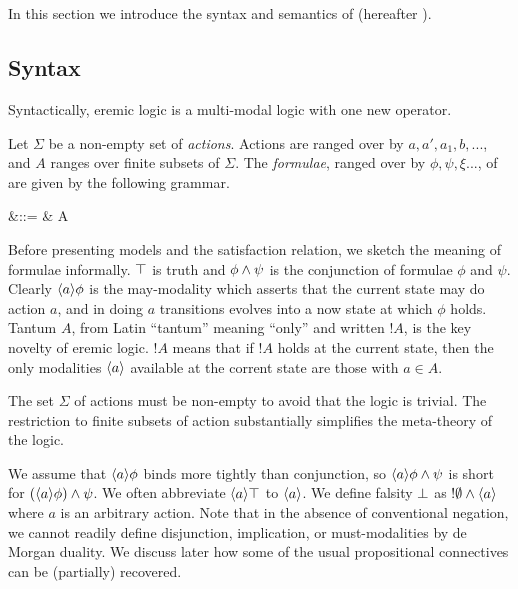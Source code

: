 \section{\ELFULL}\label{coreEL}

In this section we introduce the syntax and semantics of \ELFULL{}
(hereafter \ELABR{}).  

\subsection{Syntax}
\label{elsyntax}
\NI Syntactically, eremic logic is a multi-modal logic with one new
operator.

\begin{definition} Let $\Sigma$ be a non-empty set of \emph{actions}.
Actions are ranged over by $a, a', a_1, b, ...$, and $A$ ranges over
finite subsets of $\Sigma$. The \emph{formulae}, ranged over by $\phi,
\psi, \xi ...$, of \ELABR{} are given by the
following grammar.

\begin{GRAMMAR}
  \phi 
     &\quad ::= \quad & 
  \TRUE 
     \VERTICAL 
  \phi \AND \psi
     \VERTICAL 
     \VERTICAL 
  \fBang A 
\end{GRAMMAR}
\end{definition}

\NI Before presenting models and the satisfaction relation, we sketch
the meaning of formulae informally. $\top$ is truth and $\phi \land
\psi$ is the conjunction of formulae $\phi$ and $\psi$. Clearly
$\langle a \rangle \phi$ is the may-modality which asserts that the current
state may do action $a$, and in doing $a$ transitions evolves into a
now state at which $\phi$ holds. Tantum $A$, from Latin ``tantum''
meaning ``only'' and written $!A$, is the key novelty of eremic logic.
$!A$ means that if $!A$ holds at the current state, then the only
modalities $\langle a \rangle$ available at the corrent state are those with
$a \in A$.

The set $\Sigma$ of actions must be non-empty to avoid that the logic
is trivial. The restriction to finite subsets of action substantially
simplifies the meta-theory of the logic.

We assume that $\langle a \rangle \phi$ binds more tightly than conjunction, so
$\langle a \rangle \phi \land \psi$ is short for $(\langle a \rangle \phi) \land \psi$.
We often abbreviate $\langle a \rangle \top$ to $\langle a \rangle$. We define falsity
$\bot$ as $!\emptyset \land \langle a \rangle$ where $a$ is an arbitrary
action. Note that in the absence of conventional negation, we cannot
readily define disjunction, implication, or must-modalities by de
Morgan duality. We discuss later  how some of the usual
propositional connectives can be (partially) recovered. 

